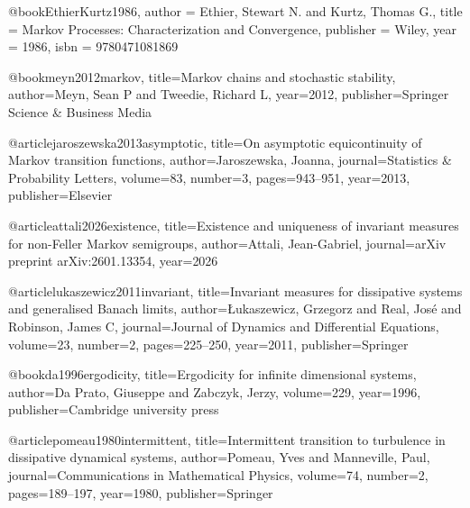
 @book{EthierKurtz1986,
  author    = {Ethier, Stewart N. and Kurtz, Thomas G.},
  title     = {Markov Processes: Characterization and Convergence},
  publisher = {Wiley},
  year      = {1986},
  isbn      = {9780471081869}
}


 @book{meyn2012markov,
  title={Markov chains and stochastic stability},
  author={Meyn, Sean P and Tweedie, Richard L},
  year={2012},
  publisher={Springer Science \& Business Media}
}



  @article{jaroszewska2013asymptotic,
  title={On asymptotic equicontinuity of Markov transition functions},
  author={Jaroszewska, Joanna},
  journal={Statistics \& Probability Letters},
  volume={83},
  number={3},
  pages={943--951},
  year={2013},
  publisher={Elsevier}
}




 @article{attali2026existence,
  title={Existence and uniqueness of invariant measures for non-Feller Markov semigroups},
  author={Attali, Jean-Gabriel},
  journal={arXiv preprint arXiv:2601.13354},
  year={2026}
}



 @article{lukaszewicz2011invariant,
  title={Invariant measures for dissipative systems and generalised Banach limits},
  author={{\L}ukaszewicz, Grzegorz and Real, Jos{\'e} and Robinson, James C},
  journal={Journal of Dynamics and Differential Equations},
  volume={23},
  number={2},
  pages={225--250},
  year={2011},
  publisher={Springer}
}

 

@book{da1996ergodicity,
  title={Ergodicity for infinite dimensional systems},
  author={Da Prato, Giuseppe and Zabczyk, Jerzy},
  volume={229},
  year={1996},
  publisher={Cambridge university press}
}



  @article{pomeau1980intermittent,
  title={Intermittent transition to turbulence in dissipative dynamical systems},
  author={Pomeau, Yves and Manneville, Paul},
  journal={Communications in Mathematical Physics},
  volume={74},
  number={2},
  pages={189--197},
  year={1980},
  publisher={Springer}
}



